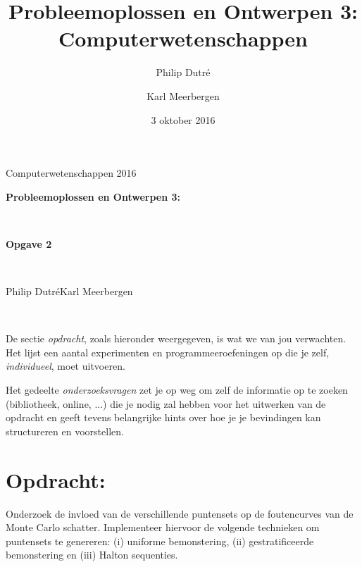 \documentclass[10pt,a4paper]{article}
\title{Probleemoplossen en Ontwerpen 3: Computerwetenschappen}
\author{Philip Dutr\'e \and Karl Meerbergen}
\date{3 oktober 2016}
\begin{document}
\begin{flushright}
	Computerwetenschappen 2016\\[1cm]
\end{flushright}
\begin{center}%
	\begin{huge}
		\textbf{Probleemoplossen en Ontwerpen 3:}
	\end{huge}\\[0.25cm]
	\begin{huge}
		\textbf{\textemdash Opgave 2\textemdash}
	\end{huge}\\[0.75cm]
	\begin{large}
	Philip Dutr\'e\hspace{1cm}Karl Meerbergen
	\end{large}\\[0.75cm]
\end{center}

De sectie \emph{opdracht}, zoals hieronder weergegeven, is wat we van jou verwachten. Het lijst een aantal experimenten en programmeeroefeningen op die je zelf, \emph{individueel}, moet uitvoeren.

Het gedeelte \emph{onderzoeksvragen} zet je op weg om zelf de informatie op te zoeken (bibliotheek, online, ...) die je nodig zal hebben voor het uitwerken van de opdracht en geeft tevens belangrijke hints over hoe je je bevindingen kan structureren en voorstellen.

\section*{Opdracht:}

Onderzoek de invloed van de verschillende puntensets op de foutencurves van de Monte Carlo schatter. Implementeer hiervoor de volgende technieken om puntensets te genereren: (i) uniforme bemonstering, (ii) gestratificeerde bemonstering en (iii) Halton sequenties.
\end{document}

